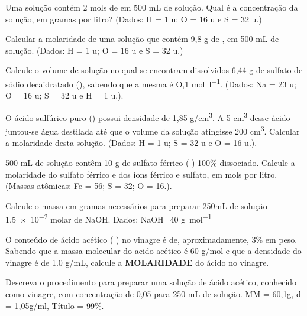 \documentclass[12pt]{scrartcl}
\begin{document}
\begin{exercise}
Uma solução contém 2 mols de  em 500 mL de solução. Qual é a concentração da solução, em gramas por litro? (Dados: H = 1 u; O = 16 u e S = 32 u.)
\end{exercise}




\begin{exercise}
Calcular a molaridade de uma solução que contém 9,8 g de , em 500 mL de solução. (Dados: H = 1 u; O = 16 u e S = 32 u.)
\end{exercise}



\begin{exercise}
Calcule o volume de solução no qual se encontram dissolvidos 6,44 g de sulfato de sódio decaidratado (), sabendo que a
mesma é O,1 \unit{\mol\per\litre}. (Dados: Na = 23 u; O = 16 u; S = 32 u e H = 1 u.).
\end{exercise}



\begin{exercise}
O ácido sulfúrico puro () possui densidade de 1,85 g/cm\textsuperscript{3}. A 5 cm\textsuperscript{3} desse ácido juntou-se água destilada até que o volume da solução atingisse 200 cm\textsuperscript{3}. Calcular a molaridade desta solução. (Dados: H = 1 u; S = 32 u e O = 16 u.).
\end{exercise}




\begin{exercise}
500 mL de solução contêm 10 g de sulfato férrico (    ) 100\% dissociado. Calcule a molaridade do sulfato férrico e dos íons férrico e sulfato, em mols por litro.
(Massas atômicas: Fe = 56; S = 32; O = 16.).
\end{exercise}




\begin{exercise}
Calcule o massa em gramas necessários para preparar 250mL de solução \num{1.5e-2} molar de NaOH. Dados: NaOH=40 \unit{\gram\per\mole}
\end{exercise}



\begin{exercise}
O conteúdo de ácido acético ( ) no vinagre é de, aproximadamente, 3\% em peso. Sabendo que a massa molecular do acido acético é 60 g/mol e que a densidade do vinagre é de 1.0 g/mL, calcule a \textbf{MOLARIDADE} do ácido no vinagre.
\end{exercise}




\begin{exercise}
Descreva o procedimento para preparar uma solução de ácido acético, conhecido como vinagre,  com concentração de 0,05 para 250 mL de solução. MM = 60,1g, d = 1,05g/ml, Título = 99\%.
\end{exercise}






\end{document}
